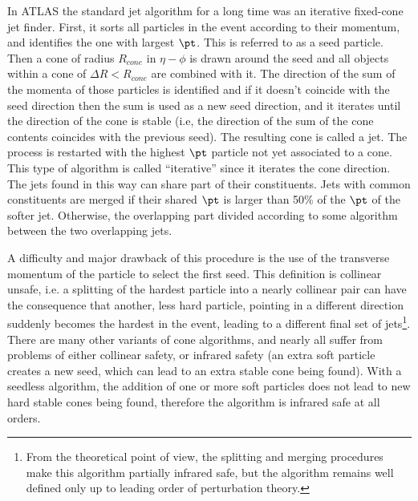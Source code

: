 In ATLAS the standard jet algorithm  for a long time was an iterative fixed-cone jet finder. 
First, it sorts all particles in the event according to their momentum, and identifies the one with largest $\pt$.  This is referred to as a seed particle.  Then a cone of radius $R_{cone}$ in  $\eta - \phi$ is drawn around the seed and all objects within a cone of $\Delta R < R_{cone}$ are combined with it. The direction of the sum of the momenta of those particles is identified and if it doesn't coincide with the seed direction then the sum is used as a new seed direction, and it iterates until the direction of the cone is stable (i.e, the direction of the sum of the cone contents coincides with the previous seed). The resulting cone is called a jet.  The process is restarted with the highest $\pt$ particle not yet associated to a cone.  This type of algorithm is called  ``iterative'' since it iterates the cone direction. The jets found in this way can share part of their constituents. Jets with common constituents are merged if their shared $\pt$ is larger than 50\% of the $\pt$ of the softer jet.  Otherwise, the overlapping part  %
divided according to some algorithm between the two overlapping jets.

A difficulty and major drawback of this procedure is the use of the transverse momentum of the particle to select the first seed. This definition is collinear unsafe, i.e. a splitting of the hardest particle into a nearly collinear pair can have the consequence that another, less hard particle, pointing in a different direction suddenly becomes the hardest in the event, leading to a different final set of jets\footnote{From the theoretical point of view, the splitting and merging procedures make this algorithm partially infrared safe, but the algorithm remains well defined only up to leading order of perturbation theory.}. There are many other variants of cone algorithms, and nearly all suffer from problems of either collinear safety, or infrared safety (an extra soft particle creates a new seed, which can lead to an extra stable cone being found). %
With a seedless algorithm, the addition of one or more soft particles does not lead to new hard stable cones being found, %
therefore the algorithm is infrared safe at all orders.


